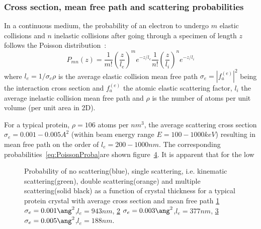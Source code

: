 \documentclass[a4paper,10pt]{article}
\begin{document}
\subsubsection{Cross section, mean free path and scattering probabilities}
In a continuous medium, the probability of an electron to undergo $m$ elastic collisions and $n$ inelastic collisions after going through a specimen of length $z$ follows the Poisson distribution~\cite{Latychevskaia2019}:
\begin{equation}\label{eq:PoissonProba}
  P_{mn}(z) =
    \frac{1}{m!}\left(\frac{z}{l_e}\right)^me^{-z/l_e}
    \frac{1}{n!}\left(\frac{z}{l_i}\right)^ne^{-z/l_i}
\end{equation}
where $l_e=1/\sigma_e\rho$ is the average elastic collision mean free path $\sigma_e=|f^{(e)}_a|^2$ being the interaction cross section and $f^{(e)}_a$ the atomic elastic scattering factor, $l_i$ the average inelastic collision mean free path and $\rho$ is the number of atoms per unit volume (per unit area in 2D).

For a typical protein, $\rho=106$ atoms per $nm^3$, the average scattering cross section $\sigma_e=0.001-0.005A^2$ (within beam energy range $E=100-1000keV$)  resulting in mean free path on the order of $l_e=200-1000nm$. The corresponding probabilities~\eqref{eq:PoissonProba}are shown figure~\ref{fig:Pcoh_kin_dual_dyn}. It is apparent that for the low

  \begin{figure}[h!]
  	\begin{subfigure}{0.32\textwidth}
  		\centering
      \def\svgwidth{\columnwidth}
  		
  		\caption{}\label{fig:Pcoh_kin_dual_dyn0}
  	\end{subfigure}
  	\begin{subfigure}{0.32\textwidth}
  		\centering
      \def\svgwidth{\columnwidth}
  		
  		\caption{}\label{fig:Pcoh_kin_dual_dyn1}
  	\end{subfigure}
    \begin{subfigure}{0.32\textwidth}
  		\centering
      \def\svgwidth{\columnwidth}
  		
  		\caption{}\label{fig:Pcoh_kin_dual_dyn2}
  	\end{subfigure}

  	\caption[protein multiple scattering and mean free path]{
    Probability of no scattering(blue), single scattering, i.e. kinematic scattering(green), double scattering(orange) and multiple scattering(solid black) as a function of crystal thickness for a typical protein crystal with average cross section and mean free path
  		\ref{fig:Pcoh_kin_dual_dyn0} $\sigma_e=0.001\ang^2$,$l_e=943nm$,
  		\ref{fig:Pcoh_kin_dual_dyn1} $\sigma_e=0.003\ang^2$,$l_e=377nm$,
  		\ref{fig:Pcoh_kin_dual_dyn2} $\sigma_e=0.005\ang^2$,$l_e=188nm$.
  	}\label{fig:Pcoh_kin_dual_dyn}
  \end{figure}
\end{document}
